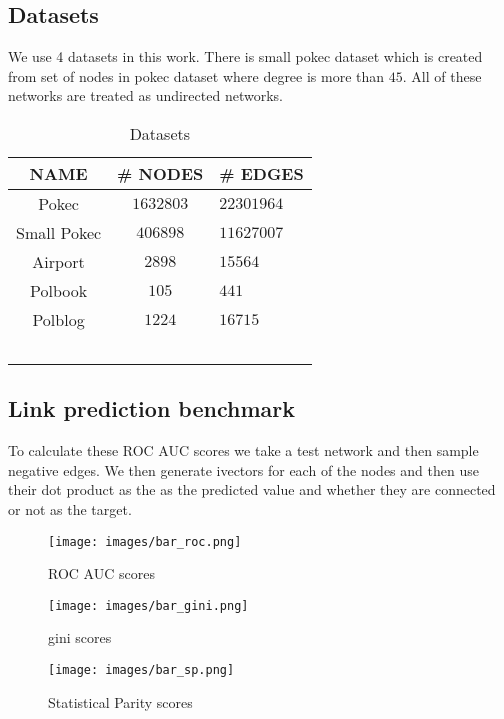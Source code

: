 \documentclass[sigconf,authordraft]{acmart}
\begin{document}
\subsection{Datasets}
We use 4 datasets in this work. There is small pokec dataset which is created from set of nodes in pokec dataset where degree is more than $45$. All of these networks are treated as undirected networks.

\begin{table}[h]
  \caption{Datasets}
  \label{table:datasets}
  \begin{tabular}{ccl}
    \toprule
    NAME & \#  NODES & \# EDGES\\
    \midrule
    Pokec       & $1632803$ & $22301964$ \\
    Small Pokec & $406898$ & $11627007$  \\
Airport & $2898$ & $15564$  \\
Polbook         &$105$&$441$  \\
Polblog         & $1224$ & $16715$  \\\
    \bottomrule
  \end{tabular}
\end{table}

\subsection{Link prediction benchmark}

To calculate these ROC AUC scores we take a test network and then sample negative edges. We then generate ivectors for each of the nodes and then use their dot product as the as the predicted value and whether they are connected or not as the target.
\begin{figure}[h]
  \centering
  \texttt{[image: images/bar\_roc.png]}
  \caption{ROC AUC scores}
\end{figure}
\begin{figure}[h]
  \centering
  \texttt{[image: images/bar\_gini.png]}
  \caption{gini scores}
\end{figure}
\begin{figure}[h]
  \centering
  \texttt{[image: images/bar\_sp.png]}
  \caption{Statistical Parity scores}
\end{figure}
\end{document}
